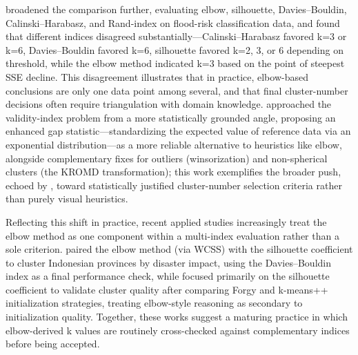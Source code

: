 \cite{ashari2023analysis} broadened the comparison further, evaluating elbow, silhouette, Davies--Bouldin, Calinski--Harabasz, and Rand-index on flood-risk classification data, and found that different indices disagreed substantially---Calinski--Harabasz favored k=3 or k=6, Davies--Bouldin favored k=6, silhouette favored k=2, 3, or 6 depending on threshold, while the elbow method indicated k=3 based on the point of steepest SSE decline. This disagreement illustrates that in practice, elbow-based conclusions are only one data point among several, and that final cluster-number decisions often require triangulation with domain knowledge. \cite{khan2024addressing} approached the validity-index problem from a more statistically grounded angle, proposing an enhanced gap statistic---standardizing the expected value of reference data via an exponential distribution---as a more reliable alternative to heuristics like elbow, alongside complementary fixes for outliers (winsorization) and non-spherical clusters (the KROMD transformation); this work exemplifies the broader push, echoed by \cite{schubert2023stop}, toward statistically justified cluster-number selection criteria rather than purely visual heuristics.

Reflecting this shift in practice, recent applied studies increasingly treat the elbow method as one component within a multi-index evaluation rather than a sole criterion. \cite{meliyana2025performance} paired the elbow method (via WCSS) with the silhouette coefficient to cluster Indonesian provinces by disaster impact, using the Davies--Bouldin index as a final performance check, while \cite{abdillah2025implementation} focused primarily on the silhouette coefficient to validate cluster quality after comparing Forgy and k-means++ initialization strategies, treating elbow-style reasoning as secondary to initialization quality. Together, these works suggest a maturing practice in which elbow-derived k values are routinely cross-checked against complementary indices before being accepted.

